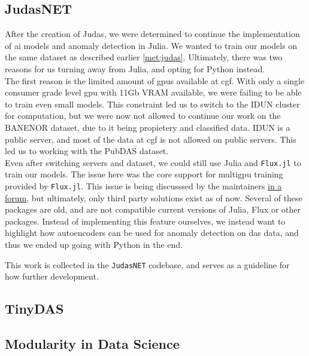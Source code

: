 \subsection{JudasNET}

After the creation of Judas, we were determined to continue the implementation of \acrshort{ai} models and anomaly detection in Julia. We wanted to train our models on the same dataset as described earlier \ref{met:judas}. Ultimately, there was two reasons for us turning away from Julia, and opting for Python instead. \\

The first reason is the limited amount of \acrshort{gpu}s available at \acrshort{cgf}. With only a single consumer grade level \acrshort{gpu} with 11Gb VRAM available, we were failing to be able to train even small models. This constraint led us to switch to the IDUN cluster for computation, but we were now not allowed to continue our work on the BANENOR dataset, due to it being propietery and classified data. IDUN is a public server, and most of the data at \acrshort{cgf} is not allowed on public servers. This led us to working with the PubDAS dataset. \\

Even after switching servers and dataset, we could still use Julia and \texttt{Flux.jl} to train our models. The issue here was the core support for multigpu training provided by \texttt{Flux.jl}. This issue is being discusssed by the maintainers \href{https://github.com/FluxML/Flux.jl/issues/1829}{in a forum}, but ultimately, only third party solutions exist as of now. Several of these packages are old, and are not compatible current versions of Julia, Flux or other packages. Instead of implementing this feature ourselves, we instead want to highlight how autoencoders can be used for anomaly detection on \acrshort{das} data, and thus we ended up going with Python in the end. 

This work is collected in the \texttt{JudasNET} codebase, and serves as a guideline for how further development.


\subsection{TinyDAS}



\subsection{Modularity in Data Science}

